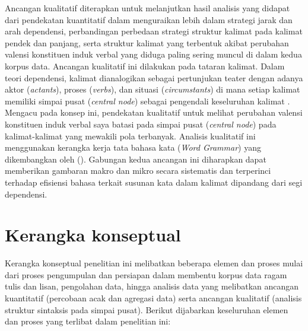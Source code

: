 Ancangan kualitatif diterapkan untuk melanjutkan hasil analisis yang didapat dari pendekatan kuantitatif dalam menguraikan lebih dalam strategi jarak dan arah dependensi, perbandingan perbedaan strategi struktur kalimat pada kalimat pendek dan panjang, serta struktur kalimat yang terbentuk akibat perubahan valensi konstituen induk verbal yang diduga paling sering muncul di dalam kedua korpus data. Ancangan kualitatif ini dilakukan pada tataran kalimat. Dalam teori dependensi, kalimat dianalogikan sebagai pertunjukan teater dengan adanya aktor (\textit{actants}), proses (\textit{verbs}), dan situasi (\textit{circumstants}) di mana setiap kalimat memiliki simpai pusat (\textit{central node}) sebagai pengendali keseluruhan kalimat \citep{tesniere1959elements}. Mengacu pada konsep ini, pendekatan kualitatif untuk melihat perubahan valensi konstituen induk verbal saya batasi pada simpai pusat (\textit{central node}) pada kalimat-kalimat yang mewakili pola terbanyak. Analisis kualitatif ini menggunakan kerangka kerja tata bahasa kata (\textit{Word Grammar}) yang dikembangkan oleh (\citealp{hudson1984word,hudson2007language}). Gabungan kedua ancangan ini diharapkan dapat memberikan gambaran makro dan mikro secara sistematis dan terperinci terhadap efisiensi bahasa terkait susunan kata dalam kalimat dipandang dari segi dependensi. 



\section{Kerangka konseptual}
Kerangka konseptual penelitian ini melibatkan beberapa elemen dan proses mulai dari proses pengumpulan dan persiapan dalam membentu korpus data ragam tulis dan lisan, pengolahan data, hingga analisis data yang melibatkan ancangan kuantitatif (percobaan acak dan agregasi data) serta ancangan kualitatif (analisis struktur sintaksis pada simpai pusat). Berikut dijabarkan keseluruhan elemen dan proses yang terlibat dalam penelitian ini:

